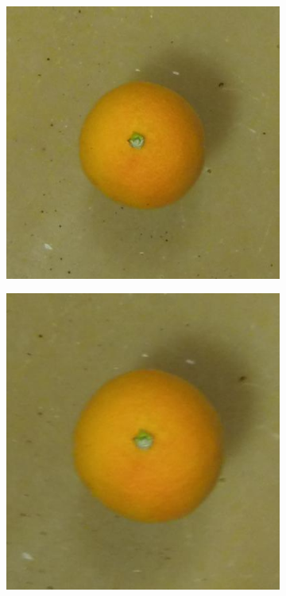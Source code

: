 \documentclass {udthesis}
\begin{document}
\begin{figure}
\begin{subfigure}[]{0.12\textwidth}
      \caption{}
  \end{subfigure}
  \begin{subfigure}[]{0.12\textwidth}
      \includegraphics[width=\textwidth]{orange4_obj_11/orange4_011_20}
      \caption{}
  \end{subfigure}
  \begin{subfigure}[]{0.12\textwidth}
      \includegraphics[width=\textwidth]{orange4_obj_11/orange4_011_18}

\end{subfigure}
\end{figure}
\end{document}
